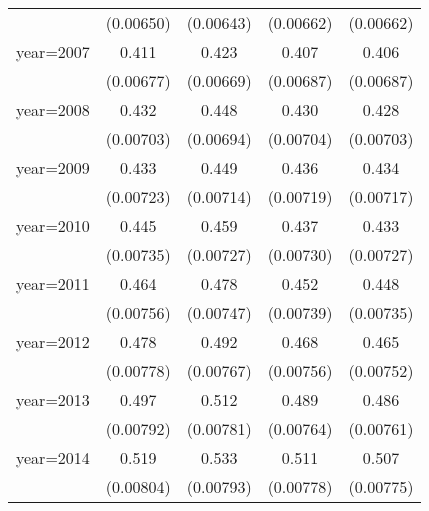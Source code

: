 \begin{table}[htbp]
\begin{tabular}{l*{4}{c}}
                    &   (0.00650)         &   (0.00643)         &   (0.00662)         &   (0.00662)         \\
\addlinespace
year=2007           &       0.411\sym{***}&       0.423\sym{***}&       0.407\sym{***}&       0.406\sym{***}\\
                    &   (0.00677)         &   (0.00669)         &   (0.00687)         &   (0.00687)         \\
\addlinespace
year=2008           &       0.432\sym{***}&       0.448\sym{***}&       0.430\sym{***}&       0.428\sym{***}\\
                    &   (0.00703)         &   (0.00694)         &   (0.00704)         &   (0.00703)         \\
\addlinespace
year=2009           &       0.433\sym{***}&       0.449\sym{***}&       0.436\sym{***}&       0.434\sym{***}\\
                    &   (0.00723)         &   (0.00714)         &   (0.00719)         &   (0.00717)         \\
\addlinespace
year=2010           &       0.445\sym{***}&       0.459\sym{***}&       0.437\sym{***}&       0.433\sym{***}\\
                    &   (0.00735)         &   (0.00727)         &   (0.00730)         &   (0.00727)         \\
\addlinespace
year=2011           &       0.464\sym{***}&       0.478\sym{***}&       0.452\sym{***}&       0.448\sym{***}\\
                    &   (0.00756)         &   (0.00747)         &   (0.00739)         &   (0.00735)         \\
\addlinespace
year=2012           &       0.478\sym{***}&       0.492\sym{***}&       0.468\sym{***}&       0.465\sym{***}\\
                    &   (0.00778)         &   (0.00767)         &   (0.00756)         &   (0.00752)         \\
\addlinespace
year=2013           &       0.497\sym{***}&       0.512\sym{***}&       0.489\sym{***}&       0.486\sym{***}\\
                    &   (0.00792)         &   (0.00781)         &   (0.00764)         &   (0.00761)         \\
\addlinespace
year=2014           &       0.519\sym{***}&       0.533\sym{***}&       0.511\sym{***}&       0.507\sym{***}\\
                    &   (0.00804)         &   (0.00793)         &   (0.00778)         &   (0.00775)         \\

\end{tabular}
\end{table}
